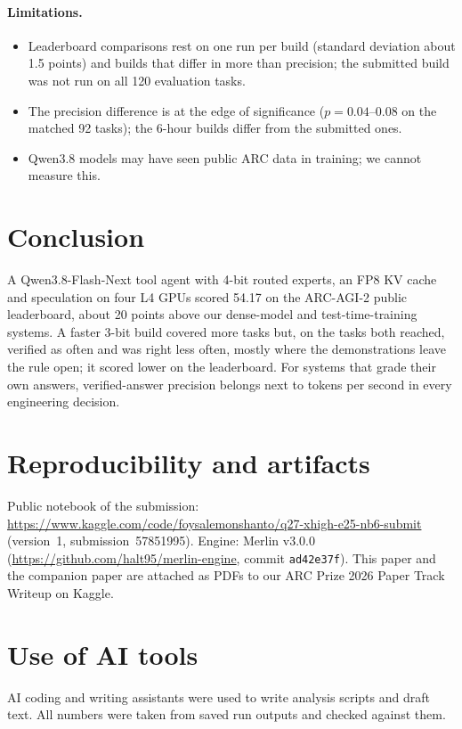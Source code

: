 \documentclass[11pt]{article}
\begin{document}
\paragraph{Limitations.}
\begin{itemize}
\item Leaderboard comparisons rest on one run per build (standard deviation about 1.5 points) and builds that differ in more than precision; the submitted build was not run on all 120 evaluation tasks.
\item The precision difference is at the edge of significance ($p=0.04$--$0.08$ on the matched 92 tasks); the 6-hour builds differ from the submitted ones.
\item Qwen3.8 models may have seen public ARC data in training; we cannot measure this.
\end{itemize}

\section{Conclusion}
A Qwen3.8-Flash-Next tool agent with 4-bit routed experts, an FP8 KV cache and speculation on four L4 GPUs scored 54.17 on the ARC-AGI-2 public leaderboard, about 20 points above our dense-model and test-time-training systems. A faster 3-bit build covered more tasks but, on the tasks both reached, verified as often and was right less often, mostly where the demonstrations leave the rule open; it scored lower on the leaderboard. For systems that grade their own answers, verified-answer precision belongs next to tokens per second in every engineering decision.

\section*{Reproducibility and artifacts}
Public notebook of the submission: \url{https://www.kaggle.com/code/foysalemonshanto/q27-xhigh-e25-nb6-submit} (version~1, submission~57851995). Engine: Merlin v3.0.0 (\url{https://github.com/halt95/merlin-engine}, commit \texttt{ad42e37f}). This paper and the companion paper \cite{paper1} are attached as PDFs to our ARC Prize 2026 Paper Track Writeup on Kaggle.

\section*{Use of AI tools}
AI coding and writing assistants were used to write analysis scripts and draft text. All numbers were taken from saved run outputs and checked against them.

\FloatBarrier
\appendix


\FloatBarrier


\end{document}

